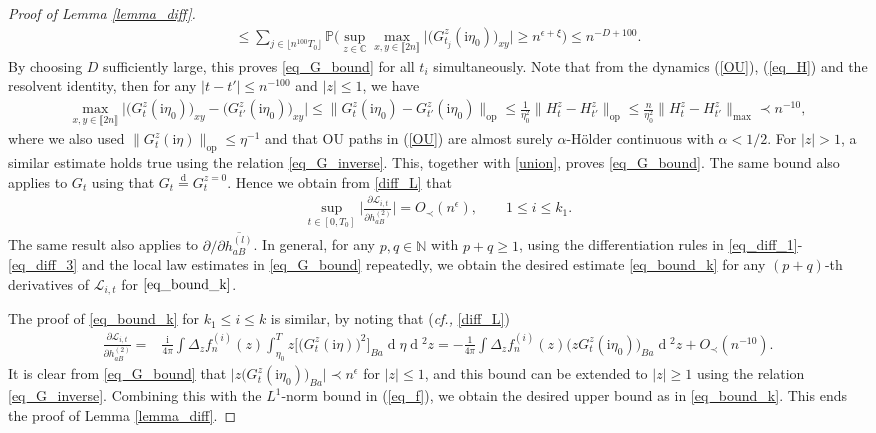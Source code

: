 \documentclass[10pt,reqno]{amsart}
\numberwithin{equation}{section}
\numberwithin{figure}{section}
\theoremstyle{plain}
\newcommand{\N}{{\mathbb{N}}}
\newcommand{\C}{{\mathbb{C}}}
\newcommand{\ii}{\mathrm{i}}
\newcommand{\<}{\langle}
\renewcommand{\>}{\rangle}
\renewcommand{\P}{{\mathbb P}}
\newcommand{\dd}{\operatorname{d}\!{}}
\newcommand{\cf}{\emph{cf., }}
\newcommand{\II}{\mathcal{L}_{i,t}}
\begin{document}
\begin{proof}[Proof of Lemma \ref{lemma_diff}]
\begin{multline}
    \leq \sum_{j \in \lfloor n^{100}T_0 \rfloor}\P\Big(  \sup_{z\in \C} \max_{x,y \in \llbracket 2n \rrbracket}   \Big|\big( G^{z}_{t_j}(\ii \eta_0) \big)_{xy}\Big| \geq n^{\epsilon+\xi} \Big) \leq n^{-D+100}.
    \end{multline}
    By choosing $D$ sufficiently large, this proves \eqref{eq_G_bound} for all $t_i$ simultaneously. Note that from the dynamics (\ref{OU}), (\ref{eq_H}) and the resolvent identity, then for any $|t-t'| \leq n^{-100}$ and $|z|\leq 1$, we have
    \begin{align}
    \max_{x,y \in \llbracket 2n \rrbracket}\Big| \big(G^{z}_t(\ii \eta_0)\big)_{xy}-\big(G^{z}_{t'}(\ii \eta_0)\big)_{xy}\Big| \leq \|G_t^{z}(\ii \eta_0)-G^{z}_{t'}(\ii \eta_0)\|_{\mathrm{op}} \leq  \frac{1}{\eta_0^2} \|H_t^{z} -H_{t'}^{z} \|_{\mathrm{op}} \leq  \frac{n}{\eta_0^2} \|H_t^{z} -H_{t'}^{z} \|_{\mathrm{max}} \prec n^{-10},
    \end{align}
    where we also used  $\|G^z_t(\ii \eta)\|_{\mathrm{op}} \leq \eta^{-1}$ and that OU paths in (\ref{OU}) are almost surely $\alpha$-H\"{o}lder continuous with $\alpha<1/2$. For $|z|>1$, a similar estimate holds true using the relation \eqref{eq_G_inverse}. This, together with \eqref{union},  proves \eqref{eq_G_bound}.  The same bound also applies to $G_t$ using that $G_t\overset{\mathrm{d}}{=}G^{z=0}_t$.
    Hence we obtain from \eqref{diff_L} that
	\begin{align}
		\sup_{t\in [0,T_0]} \Big|\frac{\partial \II }{\partial h^{(2)}_{aB}}\Big|  =O_\prec (n^{\epsilon}), \qquad 1\leq i\leq k_1.
	\end{align} 
	The same result also applies to $\partial /\partial \overline{h^{(l)}_{aB}}$. In general, for any $p,q \in \N$ with $p+q\geq 1$, using the differentiation rules in \eqref{eq_diff_1}-\eqref{eq_diff_3} and the local law estimates in \eqref{eq_G_bound} repeatedly, we obtain the desired estimate \eqref{eq_bound_k} for any $(p+q)$-th derivatives of $\II$ for $\eqref{eq_bound_k}$. 

    The proof of \eqref{eq_bound_k} for $k_1 \leq i\leq k$ is similar, by noting that (\cf \eqref{diff_L})
    	\begin{align}\label{diff_LL}
		\frac{\partial \II }{\partial h^{(2)}_{aB}}
		=&\frac{\ii}{4\pi} \int \Delta_z f^{(i)}_n(z) \int_{\eta_0}^{T}  z\big[ \big(G_t^z(\ii \eta)\big)^2  \big]_{Ba}  \dd \eta \dd^2 z=-\frac{1}{4\pi} \int \Delta_z f^{(i)}_n(z)  \big(z G^z_t(\ii \eta_0)\big)_{Ba} \dd^2 z+O_\prec(n^{-10}).
	\end{align}
    It is clear from \eqref{eq_G_bound} that $\big|z\big( G^z_t(\ii \eta_0)\big)_{Ba}\big| \prec n^{\epsilon}$ for $|z|\leq 1$, and this bound can be extended to $|z|\geq 1$ using the relation \eqref{eq_G_inverse}. Combining this with the $L^{1}$-norm bound in (\ref{eq_f}), we obtain the desired upper bound as in \eqref{eq_bound_k}.  This ends the proof of Lemma \ref{lemma_diff}.
\end{proof}
\end{document}
